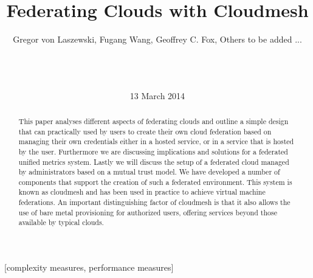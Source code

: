 \documentclass{tex/sig-alternate}
\newcommand{\TITLE}{Federating Clouds with Cloudmesh}
\begin{document}
 
% 
 
\title{\TITLE} 
 
\author{ 
\alignauthor 
Gregor von Laszewski, 
Fugang Wang, 
Geoffrey C. Fox, 
Others to be added ...  \\
       \\
       \\
       \\ 
} 
\date{13 March 2014} 
 
\toappear{} 
\maketitle 
\begin{abstract} 

This paper analyses different aspects of federating clouds and outline
a simple design that can practically used by users to create their own
cloud federation based on managing their own credentials either in a
hosted service, or in a service that is hosted by the
user. Furthermore we are discussing implications and solutions for a
federated unified metrics system. Lastly we will discuss the setup of
a federated cloud managed by administrators based on a mutual trust
model. We have developed a number of components that support the
creation of such a federated environment. This system is known as
cloudmesh and has been used in practice to achieve virtual machine
federations. An important distinguishing factor of cloudmesh is that
it also allows the use of bare metal provisioning for authorized
users, offering services beyond those available by typical
clouds. 

 
\end{abstract} 
 
[complexity measures, performance measures] 
 
\end{document}
